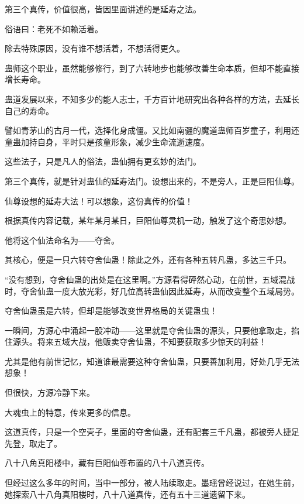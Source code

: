 
\begin{this_body}



第三个真传，价值很高，皆因里面讲述的是延寿之法。

俗语曰：老死不如赖活着。

除去特殊原因，没有谁不想活着，不想活得更久。

蛊师这个职业，虽然能够修行，到了六转地步也能够改善生命本质，但却不能直接增长寿命。

蛊道发展以来，不知多少的能人志士，千方百计地研究出各种各样的方法，去延长自己的寿命。

譬如青茅山的古月一代，选择化身成僵。又比如南疆的魔道蛊师百岁童子，利用还童蛊加持自身，平时只是孩童形象，减少生命流逝速度。

这些法子，只是凡人的俗法，蛊仙拥有更玄妙的法门。

第三个真传，就是针对蛊仙的延寿法门。设想出来的，不是旁人，正是巨阳仙尊。

仙尊设想的延寿大法！可以想象，这份真传的价值！

根据真传内容记载，某年某月某日，巨阳仙尊灵机一动，触发了这个奇思妙想。

他将这个仙法命名为——夺舍。

其核心，便是一只六转夺舍仙蛊！除此之外，还有各种五转凡蛊，多达三千只。

“没有想到，夺舍仙蛊的出处是在这里啊。”方源看得砰然心动，在前世，五域混战时，夺舍仙蛊一度大放光彩，好几位高转蛊仙因此延寿，从而改变整个五域局势。

夺舍仙蛊虽是六转，但却是能够改变世界格局的关键蛊虫！

一瞬间，方源心中涌起一股冲动——这里就是夺舍仙蛊的源头，只要他拿取走，掐住源头。将来五域大战，他贩卖夺舍仙蛊，不知要获取多少惊天的利益！

尤其是他有前世记忆，知道谁最需要这种夺舍仙蛊，只要善加利用，好处几乎无法想象！

但很快，方源冷静下来。

大魂虫上的特意，传来更多的信息。

这道真传，只是一个空壳子，里面的夺舍仙蛊，还有配套三千凡蛊，都被旁人捷足先登，取走了。

八十八角真阳楼中，藏有巨阳仙尊布置的八十八道真传。

但经过这么多年的时间，当中一部分，被人陆续取走。墨瑶曾经说过，在她生前，她探索八十八角真阳楼时，八十八道真传，还有五十三道遗留下来。


\end{this_body}
